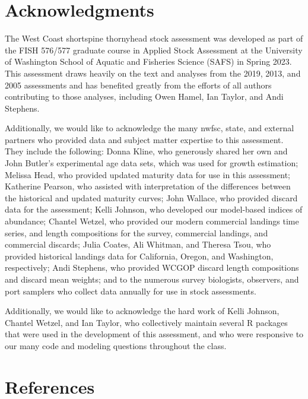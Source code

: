 \documentclass[11pt,
  english,
  letterpaper,
]{article}
\begin{document}
\hypertarget{acknowledgments}{%
\section{Acknowledgments}\label{acknowledgments}}

The West Coast shortspine thornyhead stock assessment was developed as part of the FISH 576/577 graduate course in Applied Stock Assessment at the University of Washington School of Aquatic and Fisheries Science (SAFS) in Spring 2023. This assessment draws heavily on the text and analyses from the 2019, 2013, and 2005 assessments and has benefited greatly from the efforts of all authors contributing to those analyses, including Owen Hamel, Ian Taylor, and Andi Stephens.

Additionally, we would like to acknowledge the many \gls{nwfsc}, state, and external partners who provided data and subject matter expertise to this assessment. They include the following: Donna Kline, who generously shared her own and John Butler's experimental age data sets, which was used for growth estimation; Melissa Head, who provided updated maturity data for use in this assessment; Katherine Pearson, who assisted with interpretation of the differences between the historical and updated maturity curves; John Wallace, who provided discard data for the assessment; Kelli Johnson, who developed our model-based indices of abundance; Chantel Wetzel, who provided our modern commercial landings time series, and length compositions for the survey, commercial landings, and commercial discards; Julia Coates, Ali Whitman, and Theresa Tsou, who provided historical landings data for California, Oregon, and Washington, respectively; Andi Stephens, who provided WCGOP discard length compositions and discard mean weights; and to the numerous survey biologists, observers, and port samplers who collect data annually for use in stock assessments.

Additionally, we would like to acknowledge the hard work of Kelli Johnson, Chantel Wetzel, and Ian Taylor, who collectively maintain several R packages that were used in the development of this assessment, and who were responsive to our many code and modeling questions throughout the class.

\clearpage

\hypertarget{references}{%
\section{References}\label{references}}
\end{document}
